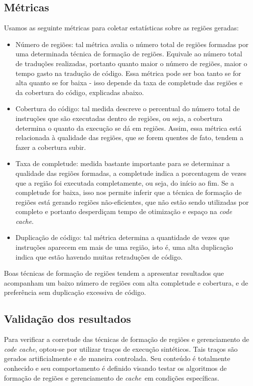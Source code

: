 \documentclass[12pt,twoside]{article}
\newcommand{\ccache}{\emph{code cache}}
\newcommand{\cache}{\emph{cache}}
\begin{document}
\subsection{Métricas}
Usamos as seguinte métricas para coletar estatísticas sobre as regiões geradas:

\begin{itemize}
\item Número de regiões: tal métrica avalia o número total de regiões formadas por uma determinada técnica de formação de regiões. Equivale ao número total de traduções realizadas, portanto quanto maior o número de regiões, maior o tempo gasto na tradução de código. Essa métrica pode ser boa tanto se for alta quanto se for baixa - isso depende da taxa de completude das regiões e da cobertura do código, explicadas abaixo.

\item Cobertura do código: tal medida descreve o percentual do número total de instruções que são executadas dentro de regiões, ou seja, a cobertura determina o quanto da execução se dá em regiões. Assim, essa métrica está relacionada à qualidade das regiões, que se forem quentes de fato, tendem a fazer a cobertura subir.

\item Taxa de completude: medida bastante importante para se determinar a qualidade das regiões formadas, a completude indica a porcentagem de vezes que a região foi executada completamente, ou seja, do início ao fim. Se a completude for baixa, isso nos permite inferir que a técnica de formação de regiões está gerando regiões não-eficientes, que não estão sendo utilizadas por completo e portanto desperdiçam tempo de otimização e espaço na \ccache.

\item Duplicação de código: tal métrica determina a quantidade de vezes que instruções aparecem em mais de uma região, isto é, uma alta duplicação indica que estão havendo muitas retraduções de código.
\end{itemize}
Boas técnicas de formação de regiões tendem a apresentar resultados que acompanham um baixo número de regiões com alta completude e cobertura, e de preferência sem duplicação excessiva de código.


\subsection{Validação dos resultados}
Para verificar a corretude das técnicas de formação de regiões e gerenciamento de \ccache, optou-se por utilizar traços de execução sintéticos. Tais traços são gerados artificialmente e de maneira controlada. Seu conteúdo é totalmente conhecido e seu comportamento é definido visando testar os algoritmos de formação de regiões e gerenciamento de \cache~em condições específicas.
\end{document}
